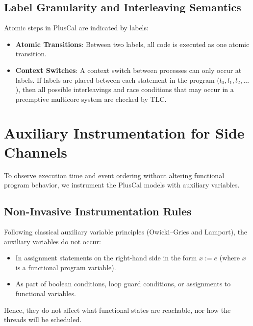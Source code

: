 \documentclass[a4paper,12pt]{report}
\begin{document}
\subsection{Label Granularity and Interleaving Semantics}
Atomic steps in PlusCal are indicated by labels:
\begin{itemize}[itemsep=0.2em, topsep=0.15em]
    \item \textbf{Atomic Transitions}: Between two labels, all code is executed as one atomic transition.
    \item \textbf{Context Switches}: A context switch between processes can only occur at labels. If labels are placed between each statement in the program ($l_0, l_1, l_2, \dots$), then all possible interleavings and race conditions that may occur in a preemptive multicore system are checked by TLC.
\end{itemize}

\section{Auxiliary Instrumentation for Side Channels}
To observe execution time and event ordering without altering functional program behavior, we instrument the PlusCal models with auxiliary variables.

\subsection{Non-Invasive Instrumentation Rules}
Following classical auxiliary variable principles (Owicki--Gries and Lamport), the auxiliary variables do not occur:
\begin{itemize}[itemsep=0.2em, topsep=0.15em]
    \item In assignment statements on the right-hand side in the form $x := e$ (where $x$ is a functional program variable).
    \item As part of boolean conditions, loop guard conditions, or assignments to functional variables.
\end{itemize}
Hence, they do not affect what functional states are reachable, nor how the threads will be scheduled.
\end{document}
